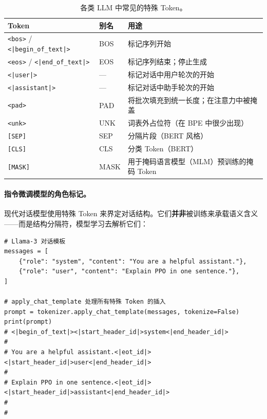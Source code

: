 \begin{table}[ht!]
\centering
\caption{各类 LLM 中常见的特殊 Token。}
\begin{tabularx}{0.92\linewidth}{@{}Z{0.78} l Z{1.22}@{}}
\toprule
\textbf{Token} & \textbf{别名} & \textbf{用途} \\
\midrule
\texttt{<bos>} / \texttt{<|begin\_of\_text|>} & BOS & 标记序列开始 \\
\texttt{<eos>} / \texttt{<|end\_of\_text|>} & EOS & 标记序列结束；停止生成 \\
\texttt{<|user|>} & --- & 标记对话中用户轮次的开始 \\
\texttt{<|assistant|>} & --- & 标记对话中助手轮次的开始 \\
\texttt{<pad>} & PAD & 将批次填充到统一长度；在注意力中被掩盖 \\
\texttt{<unk>} & UNK & 词表外占位符（在 BPE 中很少出现） \\
\texttt{[SEP]} & SEP & 分隔片段（BERT 风格） \\
\texttt{[CLS]} & CLS & 分类 Token（BERT） \\
\texttt{[MASK]} & MASK & 用于掩码语言模型（MLM）预训练的掩码 Token \\
\bottomrule
\end{tabularx}
\end{table}

\paragraph{指令微调模型的角色标记。}
\label{role-markers-for-instruction-tuned-models.}

现代对话模型使用特殊 Token 来界定对话结构。它们\textbf{并非}被训练来承载语义含义——而是结构分隔符，模型学习去解析它们：

\begin{lstlisting}[style=pythonstyle, caption={带特殊 Token 的对话模板（Llama-3 格式）。}]
# Llama-3 对话模板
messages = [
    {"role": "system", "content": "You are a helpful assistant."},
    {"role": "user", "content": "Explain PPO in one sentence."},
]

# apply_chat_template 处理所有特殊 Token 的插入
prompt = tokenizer.apply_chat_template(messages, tokenize=False)
print(prompt)
# <|begin_of_text|><|start_header_id|>system<|end_header_id|>
#
# You are a helpful assistant.<|eot_id|><|start_header_id|>user<|end_header_id|>
#
# Explain PPO in one sentence.<|eot_id|><|start_header_id|>assistant<|end_header_id|>
#
#
\end{lstlisting}

